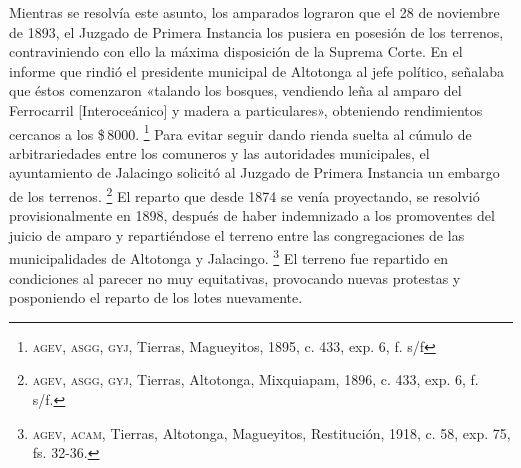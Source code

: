 \documentclass[14pt,twoside,final]{extbook} %
\let\oldfootnote\footnote
\renewcommand\footnote[1]{%
\oldfootnote{\hspace{1mm}#1}}
\begin{document}
Mientras se resolvía este asunto, los amparados lograron que el 28 de noviembre de 1893, el Juzgado de Primera Instancia los pusiera en posesión de los terrenos, contraviniendo con ello la máxima disposición de la Suprema Corte. En el informe que rindió el presidente municipal de Altotonga al jefe político, señalaba que éstos comenzaron «talando los bosques, vendiendo leña al amparo del Ferrocarril [Interoceánico] y madera a particulares», obteniendo rendimientos cercanos a los \$\,8000.\footnote{\textsc{agev, asgg, gyj}, Tierras, Magueyitos, 1895, c. 433, exp. 6, f. s/f} Para evitar seguir dando rienda suelta al cúmulo de arbitrariedades entre los comuneros y las autoridades municipales, el ayuntamiento de Jalacingo solicitó al Juzgado de Primera Instancia un embargo de los terrenos.\footnote{\textsc{agev, asgg, gyj}, Tierras, Altotonga, Mixquiapam, 1896, c. 433, exp. 6, f. s/f.} El reparto que desde 1874 se venía proyectando, se resolvió provisionalmente en 1898, después de haber indemnizado a los promoventes del juicio de amparo y repartiéndose el terreno entre las congregaciones de las municipalidades de Altotonga y Jalacingo.\footnote{\textsc{agev, acam}, Tierras, Altotonga, Magueyitos, Restitución, 1918, c. 58, exp. 75, fs. 32-36.} El terreno fue repartido en condiciones al parecer no muy equitativas, provocando nuevas protestas y posponiendo el reparto de los lotes nuevamente.
\end{document}
